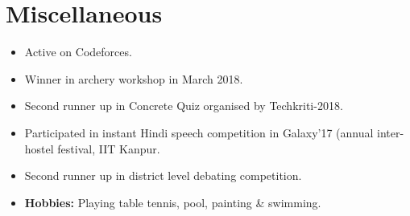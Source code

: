 \section*{Miscellaneous}
\begin{itemize}

\setlength\itemsep{0pt}
\item Active on Codeforces.
\item Winner in archery workshop in March 2018.
\item Second runner up in Concrete Quiz organised by Techkriti-2018.
\item Participated in instant Hindi speech competition in Galaxy'17 (annual inter-hostel festival, IIT Kanpur.
\item Second runner up in district level debating competition.
\item \textbf{Hobbies:} Playing table tennis, pool, painting \& swimming.

\end{itemize}